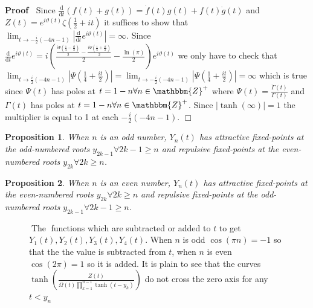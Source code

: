 \documentclass{article}
\newcommand{\mathd}{\mathrm{d}}
\newcommand{\tmop}[1]{\ensuremath{\operatorname{#1}}}
\newenvironment{proof}{\noindent\textbf{Proof\ }}{\hspace*{\fill}$\Box$\medskip}
\newtheorem{proposition}{Proposition}
{\theorembodyfont{\rmfamily}\newtheorem{remark}{Remark}}
\begin{document}
\begin{proof}
  Since $\frac{\mathd}{\mathd t} (f (t) + g (t)) = \dot{f} (t) g (t) + f (t)
  \dot{g} (t)$ and $Z (t) = e^{i \vartheta (t)} \zeta \left( \frac{1}{2} + i t
  \right)$ it suffices to show that $\lim_{t \rightarrow - \frac{i}{2} (- 4 n
  - 1)} \left| \frac{\mathd}{\mathd t} e^{i \vartheta (t)} \right| = \infty$.
  Since $\frac{\mathd}{\mathd t} e^{i \vartheta (t)} = i \left( \frac{\frac{i
  \Psi \left( \frac{1}{4} - \frac{i t}{2} \right)}{2} - \frac{i \Psi \left(
  \frac{1}{4} + \frac{i t}{2} \right)}{2}}{2} - \frac{\ln (\pi)}{2} \right)
  e^{i \vartheta (t)}$ we only have to check that $\lim_{t \rightarrow
  \frac{i}{2} (- 4 n - 1)} \left| \Psi \left( \frac{1}{4} + \frac{i t}{2}
  \right) \right| = \lim_{t \rightarrow - \frac{i}{2} (- 4 n - 1)} \left| \Psi
  \left( \frac{1}{4} + \frac{i t}{2} \right) \right| = \infty$ which is true
  since $\Psi (t)$ has poles at $t = 1 - n \forall n \in \mathbbm{Z}^+$ where
  $\Psi (t) = \frac{\dot{\Gamma} (t)}{\Gamma (t)}$ and $\Gamma (t)$ has poles
  at $t = 1 - n \forall n \in \mathbbm{Z}^+$. Since $| \tanh (\infty) | = 1$
  the multiplier is equal to 1 at each $- \frac{i}{2} (- 4 n - 1)$.
\end{proof}

\begin{proposition}
  \label{podd}When $n$ is an odd number, $Y_n (t)$ has attractive fixed-points
  at the odd-numbered roots $y_{2 k - 1} \forall 2 k - 1 \geqslant n$ and
  repulsive fixed-points at the even-numbered roots $y_{2 k} \forall 2 k
  \geqslant n$.
\end{proposition}

\begin{proposition}
  \label{peven}When $n$ is an even number, $Y_n (t)$ has attractive
  fixed-points at the even-numbered roots $y_{2 k} \forall 2 k \geqslant n$
  and repulsive fixed-points at the odd-numbered roots $y_{2 k - 1} \forall 2
  k - 1 \geqslant n$.
\end{proposition}

\begin{figure}[h]
  \caption{$\tmop{The}$ functions which are subtracted or added to $t$ to get
  $Y_1 (t), Y_2 (t), Y_3 (t), Y_4 (t)$. When $n$ is odd $\cos (\pi n) = - 1$
  so that the the value is subtracted from $t$, when $n$ is even $\cos (2 \pi)
  = 1$ so it is added. It is plain to see that the curves $\tanh \left(
  \frac{Z (t)}{\Omega (t) \prod_{k = 1}^{n - 1} \tanh (t - y_k)} \right)$ do
  not cross the zero axis for any $t < y_n$ }
\end{figure}
\end{document}
